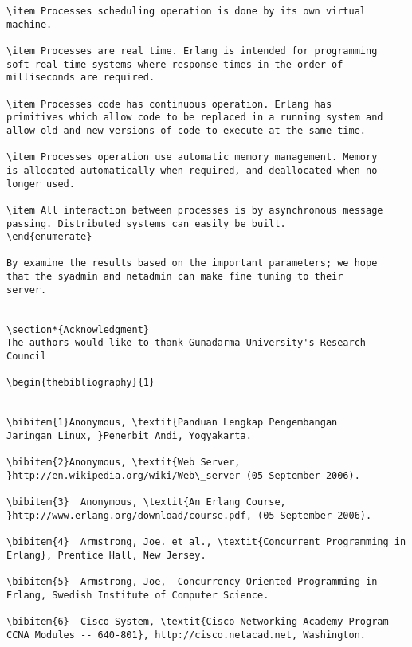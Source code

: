 \documentclass[final,
notitlepage,
narroweqnarray,
    inline,
    twoside,
]{ieee}
\begin{document}
\begin{verbatim}
\item Processes scheduling operation is done by its own virtual
machine.

\item Processes are real time. Erlang is intended for programming
soft real-time systems where response times in the order of
milliseconds are required.

\item Processes code has continuous operation. Erlang has
primitives which allow code to be replaced in a running system and
allow old and new versions of code to execute at the same time.

\item Processes operation use automatic memory management. Memory
is allocated automatically when required, and deallocated when no
longer used.

\item All interaction between processes is by asynchronous message
passing. Distributed systems can easily be built.
\end{enumerate}

By examine the results based on the important parameters; we hope
that the syadmin and netadmin can make fine tuning to their
server.


\section*{Acknowledgment}
The authors would like to thank Gunadarma University's Research
Council

\begin{thebibliography}{1}


\bibitem{1}Anonymous, \textit{Panduan Lengkap Pengembangan
Jaringan Linux, }Penerbit Andi, Yogyakarta.

\bibitem{2}Anonymous, \textit{Web Server,
}http://en.wikipedia.org/wiki/Web\_server (05 September 2006).

\bibitem{3}  Anonymous, \textit{An Erlang Course,
}http://www.erlang.org/download/course.pdf, (05 September 2006).

\bibitem{4}  Armstrong, Joe. et al., \textit{Concurrent Programming in
Erlang}, Prentice Hall, New Jersey.

\bibitem{5}  Armstrong, Joe,  Concurrency Oriented Programming in
Erlang, Swedish Institute of Computer Science.

\bibitem{6}  Cisco System, \textit{Cisco Networking Academy Program --
CCNA Modules -- 640-801}, http://cisco.netacad.net, Washington.


\end{verbatim}
\end{document}
